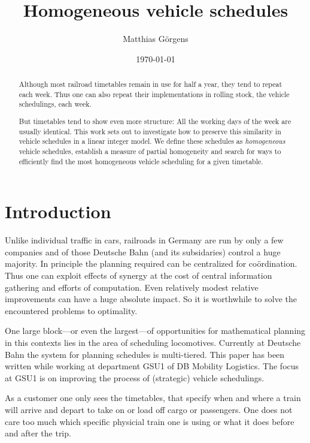\documentclass[a4paper]{amsart}
\author{Matthias Görgens}
\theoremstyle{definition}
\theoremstyle{remark}
\newcommand\mpar[1]{\marginpar {\flushleft\sffamily\small #1}}
\newcounter{todo}
\newcommand{\todo}[1]{\({}^{\text{{\arabic{todo}}}}\) \mpar{todo \arabic{todo}: #1} \addtocounter{todo}{1}}
\begin{document}
\date{\today}
\title{Homogeneous vehicle schedules}

\begin{abstract}
  Although most railroad timetables remain in use for half a year,
  they tend to repeat each week.  Thus one can also repeat
  their implementations in rolling stock, the vehicle schedulings,
  each week.  %

  But timetables tend to show even more structure: All the working
  days of the week are usually identical.  This work sets out to
  investigate how to preserve this similarity in vehicle schedules in
  a linear integer model.  We define these schedules as
  \textit{homogeneous} vehicle schedules, establish a measure of
  partial homogeneity and search for ways to efficiently find the most
  homogeneous vehicle scheduling for a given timetable.
\end{abstract}

\maketitle
\tableofcontents

\section{Introduction}
Unlike individual traffic in cars, railroads in Germany are run by
only a few companies and of those Deutsche Bahn (and its subsidaries)
control a huge majority.  In principle the planning required can be
centralized for coördination.  Thus one can exploit effects of synergy
at the cost of central information gathering and efforts of
computation.  Even relatively modest relative improvements can have a
huge absolute impact.  So it is worthwhile to solve the encountered
problems to optimality.

One large block---or even the largest---of opportunities for
mathematical planning in this contexts lies in the area of scheduling
locomotives.  Currently at Deutsche Bahn the system for planning
schedules is multi-tiered.  This paper has been written while working
at department GSU1 of DB Mobility Logistics.  The focus at GSU1 is on
improving the process of (strategic) vehicle schedulings.

As a customer one only sees the timetables, that specify when and
where a train will arrive and depart to take on or load off cargo or
passengers.  One does not care too much which specific physicial train
one is using or what it does before and after the trip.
\end{document}

